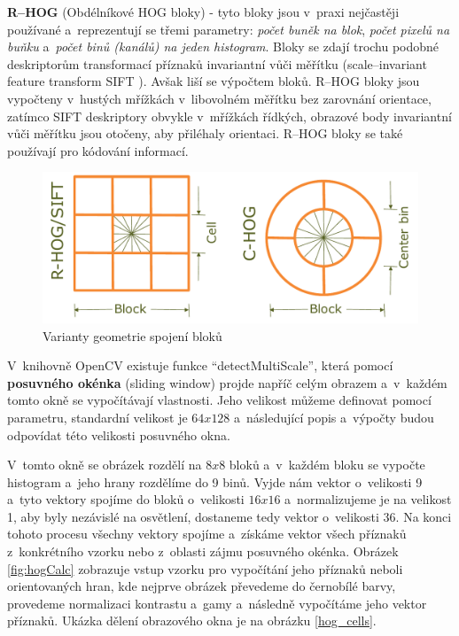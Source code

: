 \textbf{R--HOG} (Obdélníkové HOG bloky) - tyto bloky jsou v~praxi nejčastěji používané a~reprezentují se třemi parametry: \textit{počet buněk na blok}, \textit{počet pixelů na buňku} a~\textit{počet binů (kanálů) na jeden histogram}. Bloky se zdají trochu podobné deskriptorům transformací příznaků invariantní vůči měřítku (scale--invariant feature transform SIFT \cite{siftPaper}). Avšak liší se výpočtem bloků. R--HOG bloky jsou vypočteny v~hustých mřížkách v~libovolném měřítku bez zarovnání orientace, zatímco SIFT deskriptory obvykle v~mřížkách řídkých, obrazové body invariantní vůči měřítku jsou otočeny, aby přiléhaly orientaci. R--HOG bloky se také používají pro kódování informací. 
\begin{figure}[H]
  \centering
  \includegraphics[width=14cm]{figures/hog_variants.pdf}
  \caption{Varianty geometrie spojení bloků \cite{hog:dalal}}
  \label{variants_block}
\end{figure}
V~knihovně OpenCV existuje funkce ``detectMultiScale'', která pomocí \textbf{posuvného okénka} (sliding window) projde napříč celým obrazem a~v~každém tomto okně se vypočítávají vlastnosti. Jeho velikost můžeme definovat pomocí parametru, standardní velikost je $64x128$ a~následující popis a~výpočty budou odpovídat této velikosti posuvného okna.  

V~tomto okně se obrázek rozdělí na $8x8$ bloků a~v~každém bloku se vypočte histogram a~jeho hrany rozdělíme do 9 binů. Vyjde nám vektor o~velikosti 9 a~tyto vektory spojíme do bloků o~velikosti $16x16$ a~normalizujeme je na velikost 1, aby byly nezávislé na osvětlení, dostaneme tedy vektor o~velikosti 36. Na konci tohoto procesu všechny vektory spojíme a~získáme vektor všech příznaků z~konkrétního vzorku nebo z~oblasti zájmu posuvného okénka. Obrázek \ref{fig:hogCalc} zobrazuje vstup vzorku pro vypočítání jeho příznaků neboli orientovaných hran, kde nejprve obrázek převedeme do černobílé barvy, provedeme normalizaci kontrastu a~gamy a~následně vypočítáme jeho vektor příznaků.
Ukázka dělení obrazového okna je na obrázku \ref{hog_cells}.

